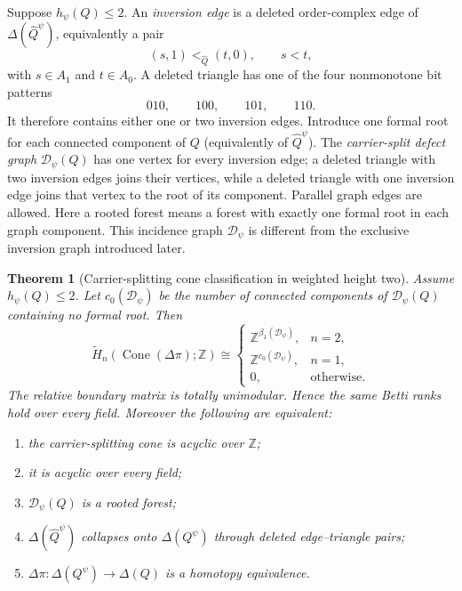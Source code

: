 \documentclass[11pt]{article}
\newtheorem{theorem}{Theorem}[section]
\newcommand{\Cone}{\operatorname{Cone}}
\begin{document}
Suppose $h_\psi(Q)\leq2$.  An \emph{inversion edge} is a deleted order-complex edge
of $\Delta(\widehat Q^\psi)$, equivalently a pair
\[
 (s,1)<_{\widehat Q}(t,0),\qquad s<t,
\]
with $s\in A_1$ and $t\in A_0$.  A deleted triangle has one of the four nonmonotone
bit patterns
\[
 010,\qquad100,\qquad101,\qquad110.
\]
It therefore contains either one or two inversion edges.  Introduce one formal root
for each connected component of $Q$ (equivalently of $\widehat Q^\psi$).  The
\emph{carrier-split defect graph} $\mathcal D_\psi(Q)$ has one vertex for every inversion edge;
a deleted triangle with two inversion edges joins their vertices, while a deleted
triangle with one inversion edge joins that vertex to the root of its component.
Parallel graph edges are allowed.  Here a rooted forest means a forest
with exactly one formal root in each graph component.  This incidence graph
$\mathcal D_\psi$ is different from the exclusive inversion graph introduced later.

\begin{theorem}[Carrier-splitting cone classification in weighted height two]
\label{thm:carrier-graph}
Assume $h_\psi(Q)\leq2$.  Let $c_0(\mathcal D_\psi)$ be the number of connected components
of $\mathcal D_\psi(Q)$ containing no formal root.  Then
\[
 \widetilde H_n\!\left(\Cone(\Delta\pi);\mathbb Z\right)
 \cong
 \begin{cases}
   \mathbb Z^{\beta_1(\mathcal D_\psi)},&n=2,\\
   \mathbb Z^{c_0(\mathcal D_\psi)},&n=1,\\
   0,&\text{otherwise}.
 \end{cases}
\]
The relative boundary matrix is totally unimodular.  Hence the same Betti ranks hold
over every field.  Moreover the following are equivalent:
\begin{enumerate}[label=(\roman*)]
\item the carrier-splitting cone is acyclic over $\mathbb Z$;
\item it is acyclic over every field;
\item $\mathcal D_\psi(Q)$ is a rooted forest;
\item $\Delta(\widehat Q^\psi)$ collapses onto $\Delta(Q^\psi)$ through deleted
edge--triangle pairs;
\item $\Delta\pi:\Delta(Q^\psi)\to\Delta(Q)$ is a homotopy equivalence.
\end{enumerate}
\end{theorem}
\end{document}
